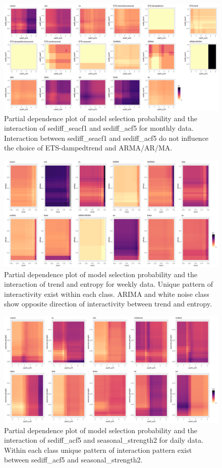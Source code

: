 \documentclass[11pt,a4paper,]{article}
\begin{document}
\begin{figure}
\centering
\includegraphics{figures/mtwopdp-1.png}
\caption{\label{fig:mtwopdp}Partial dependence plot of model selection
probability and the interaction of sediff\_seacf1 and sediff\_acf5 for
monthly data. Interaction between sediff\_seacf1 and sediff\_acf5 do not
influence the choice of ETS-dampedtrend and ARMA/AR/MA.}
\end{figure}

\begin{figure}
\centering
\includegraphics{figures/wtwopdp-1.png}
\caption{\label{fig:wtwopdp}Partial dependence plot of model selection
probability and the interaction of trend and entropy for weekly data.
Unique pattern of interactivity exist within each class. ARIMA and white
noise class show opposite direction of interactivity between trend and
entropy.}
\end{figure}

\begin{figure}
\centering
\includegraphics{figures/dtwopdp-1.png}
\caption{\label{fig:dtwopdp}Partial dependence plot of model selection
probability and the interaction of sediff\_acf5 and seasonal\_strength2
for daily data. Within each class unique pattern of interaction pattern
exist between sediff\_acf5 and seasonal\_strength2.}
\end{figure}
\end{document}
